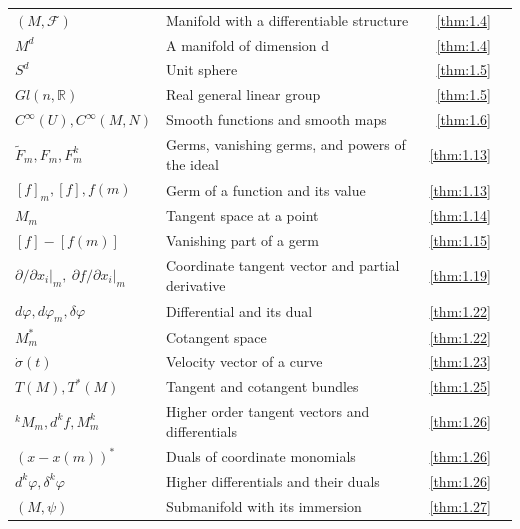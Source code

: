{\begin{longtable}{@{}>{\raggedright\arraybackslash}p{.39\linewidth}>{\raggedright\arraybackslash}p{.39\linewidth}r r@{}}
$(M,\allowbreak \mathcal{F})$ & Manifold with a differentiable structure & \ref{thm:1.4} & \pageref{thm:1.4} \\
$M^{d}$ & A manifold of dimension d & \ref{thm:1.4} & \pageref{thm:1.4} \\
$S^{d}$ & Unit sphere & \ref{thm:1.5} & \pageref{thm:1.5} \\
$Gl(n,\allowbreak \mathbb R)$ & Real general linear group & \ref{thm:1.5} & \pageref{thm:1.5} \\
$C^{\infty}(U),\allowbreak  C^{\infty}(M,\allowbreak N)$ & Smooth functions and smooth maps & \ref{thm:1.6} & \pageref{thm:1.6} \\
$\tilde{F}_{m},\allowbreak  F_{m},\allowbreak  F_{m}^{k}$ & Germs, vanishing germs, and powers of the ideal & \ref{thm:1.13} & \pageref{thm:1.13} \\
$[f]_m,\allowbreak  [f],\allowbreak  f(m)$ & Germ of a function and its value & \ref{thm:1.13} & \pageref{thm:1.13} \\
$M_{m}$ & Tangent space at a point & \ref{thm:1.14} & \pageref{thm:1.14} \\
$[f]-[f(m)]$ & Vanishing part of a germ & \ref{thm:1.15} & \pageref{thm:1.15} \\
$\left.\partial/\partial x_i\right|_m,\allowbreak \ \left.\partial f/\partial x_i\right|_m$ & Coordinate tangent vector and partial derivative & \ref{thm:1.19} & \pageref{thm:1.19} \\
$d\varphi,\allowbreak  d\varphi_{m},\allowbreak  \delta\varphi$ & Differential and its dual & \ref{thm:1.22} & \pageref{thm:1.22} \\
$M_{m}^{*}$ & Cotangent space & \ref{thm:1.22} & \pageref{thm:1.22} \\
$\dot{\sigma}(t)$ & Velocity vector of a curve & \ref{thm:1.23} & \pageref{thm:1.23} \\
$T(M),\allowbreak  T^{*}(M)$ & Tangent and cotangent bundles & \ref{thm:1.25} & \pageref{thm:1.25} \\
$^{k}M_{m},\allowbreak  d^{k}f,\allowbreak  M_{m}^{k}$ & Higher order tangent vectors and differentials & \ref{thm:1.26} & \pageref{thm:1.26} \\
$(x-x(m))^{*}$ & Duals of coordinate monomials & \ref{thm:1.26} & \pageref{thm:1.26} \\
$d^{k}\varphi,\allowbreak  \delta^{k}\varphi$ & Higher differentials and their duals & \ref{thm:1.26} & \pageref{thm:1.26} \\
$(M,\allowbreak \psi)$ & Submanifold with its immersion & \ref{thm:1.27} & \pageref{thm:1.27} \\

\end{longtable}}
